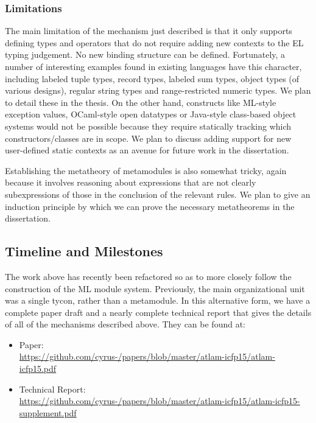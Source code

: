  

\subsubsection{Limitations}
The main limitation of the mechanism just described is that it only supports defining types and operators that do not require adding new contexts to the EL typing judgement. No new binding structure can be defined. Fortunately, a number of interesting examples found in existing languages have this character, including labeled tuple types, record types, labeled sum types, object types (of various designs), regular string types and range-restricted numeric types. We plan to detail these in the thesis. On the other hand, constructs like ML-style exception values, OCaml-style open datatypes or Java-style class-based object systems would not be possible because they require statically tracking which constructors/classes are in scope. We plan to discuss adding support for new user-defined static contexts as an avenue for future work in the dissertation.

Establishing the metatheory of metamodules is also somewhat tricky, again because it involves reasoning about expressions that are not clearly subexpressions of those in the conclusion of the relevant rules. We plan to give an induction principle by which we can prove the necessary metatheorems in the dissertation.


\subsection{Timeline and Milestones}\label{sec:metamodules-timeline}
The work above has recently been refactored so as to more closely follow the construction of the ML module system. Previously, the main organizational unit was a single tycon, rather than a metamodule. In this alternative form, we have a complete paper draft and a nearly complete technical report that gives the details of all of the mechanisms described above. They can be found at:
\begin{itemize}
\item Paper:\\ \url{https://github.com/cyrus-/papers/blob/master/atlam-icfp15/atlam-icfp15.pdf}
\item Technical Report:\\ \url{https://github.com/cyrus-/papers/blob/master/atlam-icfp15/atlam-icfp15-supplement.pdf}
\end{itemize}


